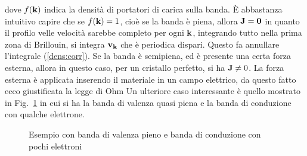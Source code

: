\documentclass[a4paper,12pt]{article}
\begin{document}
dove $f({\it\bf k})$ indica la densità di portatori di carica sulla banda. \`E abbastanza intuitivo capire che se $f({\it\bf k})=1$, cioè se la banda è piena, allora $\it\bf J = 0$ in quanto il profilo velle velocità sarebbe completo per ogni $\it\bf k$, integrando tutto nella prima zona di Brillouin, si integra $\it\bf{v_k}$ che è periodica dispari. Questo fa annullare l'integrale (\ref{dens:corr}). Se la banda è semipiena, ed è presente una certa forza esterna, allora in questo caso, per un cristallo perfetto, si ha ${\it\bf J} \neq 0$. La forza esterna è applicata inserendo il materiale in un campo elettrico, da questo fatto ecco giustificata la legge di Ohm
Un ulteriore caso interessante è quello mostrato in Fig.~\ref{semip:cond} in cui si ha la banda di valenza quasi piena e la banda di conduzione con qualche elettrone.
\begin{figure}
	\centering


	\caption{Esempio con banda di valenza pieno e banda di conduzione con pochi elettroni}
	\label{semip:cond}
\end{figure}
\end{document}
